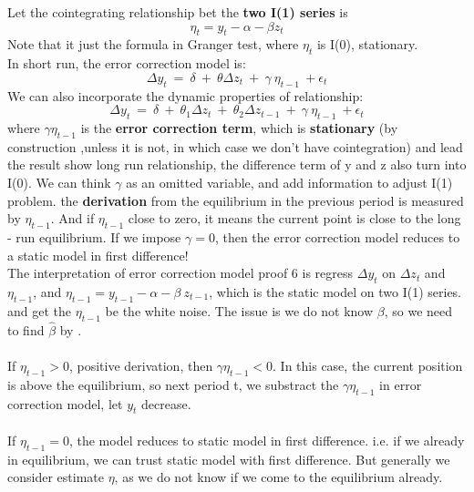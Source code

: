 \documentclass[12pt]{article}
\begin{document}
Let the cointegrating relationship  bet the \textbf{two I(1) series} is 
\begin{equation}
    \eta_t = y_t - \alpha - \beta z_t  
\end{equation}
Note that it just the formula in Granger test, where $\eta_t$ is I(0), stationary. \\
In short run, the error correction model is: 
\begin{equation}
    \Delta y_t\ =\ \delta\ +\ \theta\Delta z_t\ +\ \gamma\ \eta_{t-1}\ +\epsilon_t  
\end{equation}
We can also incorporate the dynamic properties of relationship:
$$\Delta y_t\ =\ \delta\ +\ \theta_1\Delta z_t\ +\ \theta_2\Delta z_{t-1}\ +\ \gamma\ \eta_{t-1}\ +\epsilon_t$$
\noindent where $ \gamma\eta_{t-1}$ is the \textbf{error correction term}, which is \textbf{stationary} (by construction ,unless it is not, in which case we don't have cointegration) and lead the result show long run relationship, the difference term of y and z also turn into I(0). We can think $\gamma$ as an omitted variable, and add information to adjust I(1) problem. the \textbf{derivation} from the equilibrium in the previous period is measured by $\eta_{t-1}$. And if $\eta_{t-1}$ close to zero, it means the current point is close to the long - run equilibrium. If we impose $\gamma = 0$, then the error correction model reduces to a static model in first difference! 
\\

The interpretation of error correction model {\color{Red}proof 6} is regress $\Delta y_t$ on $\Delta z_t$ and $\eta_{t-1}$, and $\eta_{t-1} = y_{t-1} -\alpha - \beta\ z_{t-1}$, which is the static model on two I(1) series. and get the $\eta_{t-1}$ be the white noise. The issue is we do not know $\beta$, so we need to find $\hat{\beta}$ by . 
\\
\\
If $\eta_{t-1} >0 $, positive derivation, then $ \gamma\eta_{t-1} <0$. In this case, the current position is above the equilibrium, so next period t, we substract the $ \gamma\eta_{t-1}$ in error correction model, let $y_t$ decrease.
\\
\\
If $\eta_{t-1} =0$, the model reduces to static model in first difference. i.e. if we already in equilibrium, we can trust static model with first difference. But generally we consider estimate $\eta$, as we do not know if we come to the equilibrium already.
\\
\end{document}
